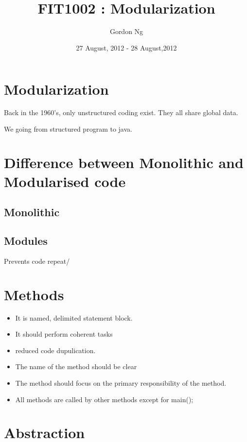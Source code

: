 \documentclass[12pt]{article}
\begin{document}
\title{FIT1002 : Modularization}
\date{27 August, 2012 - 28 August,2012 }
\author{Gordon Ng}
\maketitle

\pagebreak
\tableofcontents
\pagebreak
\section{Modularization}
Back in the 1960's, only unstructured coding exist. They all share global data.

We going from structured program to java.

\section{Difference between Monolithic and Modularised code}

\subsection{Monolithic}
\subsection{Modules}
Prevents code repeat/
\section{Methods}
\begin{itemize}
\item It is named, delimited statement block.
\item It should perform coherent tasks
\item reduced code dupulication.
\item The name of the method should be clear
\item The method should focus on the primary responsibility of the method.
\item All methods are called by other methods except for main();

\end{itemize}

\section{Abstraction}
\end{document}
